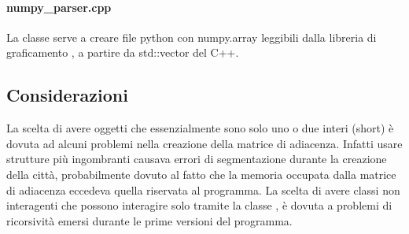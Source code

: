 \documentclass[main.tex]{subfiles}
\begin{document}
    \paragraph{numpy\_parser.cpp}
    La classe  serve a creare file python con numpy.array leggibili dalla libreria di graficamento , 
        a partire da std::vector del C++.

\subsection{Considerazioni}
    La scelta di avere oggetti che essenzialmente sono solo uno o due interi (short) è dovuta ad alcuni problemi nella creazione della matrice di adiacenza.
    Infatti usare strutture più ingombranti causava errori di segmentazione durante la creazione della città, probabilmente dovuto al fatto che la memoria
    occupata dalla matrice di adiacenza eccedeva quella riservata al programma.
    La scelta di avere classi non interagenti che possono interagire solo tramite la classe , è dovuta a problemi di ricorsività
    emersi durante le prime versioni del programma.
\end{document}
